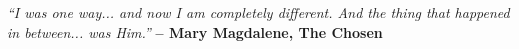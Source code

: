 \pagebreak
\clearpage
\vspace*{\fill}

{
\large
\textit{``I was one way... and now I am completely different. And the thing that happened in between... was Him.''}
\textbf{-- Mary Magdalene, The Chosen}
}

\vspace*{\fill}




    
    




